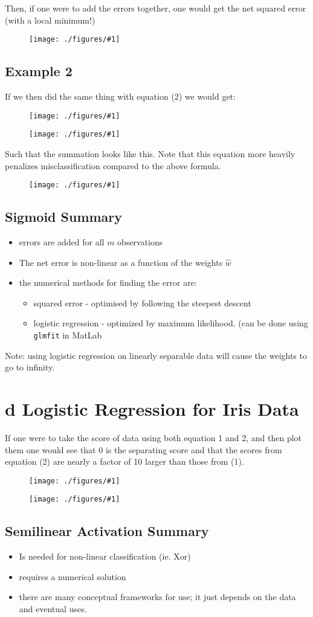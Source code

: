 \documentclass[12pt]{book}
\newcommand{\incimg}[2]{%
       \begin{figure}[h]
               \centering
               \texttt{[image: ./figures/\#1]}
       \end{figure}
}
\begin{document}
Then, if one were to add the errors together, one would get the net 
squared error (with a local minimum!)
\incimg{sig0+1}{0.4}
\pagebreak

\subsection*{Example 2}
If we then did the same thing with equation (2) we would get:
\incimg{log0}{0.5}
\incimg{log1}{0.5}

Such that the summation looks like this. Note that this equation
more heavily penalizes misclassification compared to the above formula.
\incimg{log0+1}{0.5}

\subsection*{Sigmoid Summary}
\begin{itemize}
        \item errors are added for all $m$ observations
        \item The net error is non-linear as a function of the weights
                $\hat w$
        \item the numerical methods for finding the error are:
                \begin{itemize}
                        \item squared error - optimised by following
                                the steepest descent
                        \item logistic regression - optimized by
                                maximum likelihood. (can be done 
                                using \texttt{glmfit} in MatLab
                \end{itemize}
\end{itemize}

Note: using logistic regression on linearly separable data will cause
the weights to go to infinity.

\section*{d Logistic Regression for Iris Data}
If one were to take the score of data using both equation 1 and 2, and
then plot them one would see that 0 is the separating score and
that the scores from equation (2) are nearly a factor of 10 larger 
than those from (1).
\incimg{squareErr}{0.5}
\incimg{logErr}{0.5}

\subsection*{Semilinear Activation Summary}
\begin{itemize}
        \item Is needed for non-linear classification (ie. Xor)
        \item requires a numerical solution
        \item there are many conceptual frameworks for use; it just 
                depends on the data and eventual uses.
\end{itemize}
\end{document}
